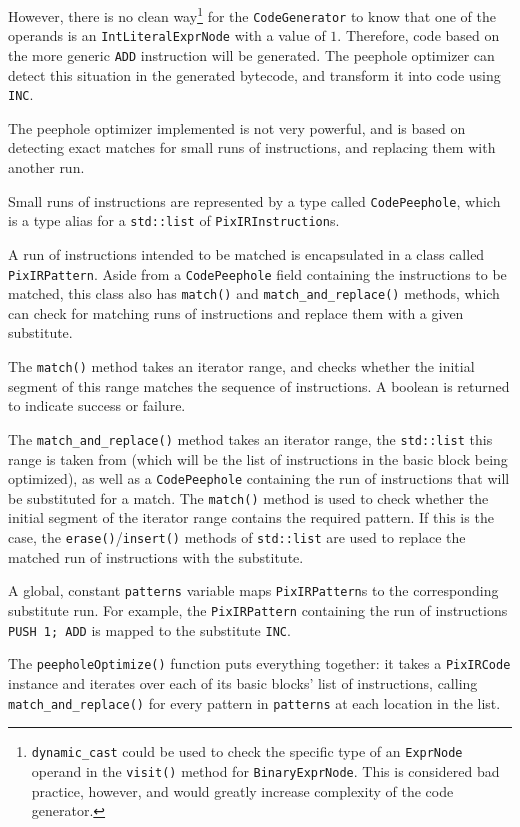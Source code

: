 \documentclass[11pt,a4paper]{scrartcl}
\begin{document}
However, there is no clean way\footnote{\verb|dynamic_cast| could be used to check the specific type of an \verb|ExprNode| operand in the \verb|visit()| method for \verb|BinaryExprNode|. This is considered bad practice, however, and would greatly increase complexity of the code generator.} for the \verb|CodeGenerator| to know that one of the operands is an \verb|IntLiteralExprNode| with a value of $1$. Therefore, code based on the more generic \verb|ADD| instruction will be generated. The peephole optimizer can detect this situation in the generated bytecode, and transform it into code using \verb|INC|.

The peephole optimizer implemented is not very powerful, and is based on detecting exact matches for small runs of instructions, and replacing them with another run.

Small runs of instructions are represented by a type called \verb|CodePeephole|, which is a type alias for a \verb|std::list| of \verb|PixIRInstruction|s.

A run of instructions intended to be matched is encapsulated in a class called \verb|PixIRPattern|. Aside from a \verb|CodePeephole| field containing the instructions to be matched, this class also has \verb|match()| and \verb|match_and_replace()| methods, which can check for matching runs of instructions and replace them with a given substitute.

The \verb|match()| method takes an iterator range, and checks whether the initial segment of this range matches the sequence of instructions. A boolean is returned to indicate success or failure.

The \verb|match_and_replace()| method takes an iterator range, the \verb|std::list| this range is taken from (which will be the list of instructions in the basic block being optimized), as well as a \verb|CodePeephole| containing the run of instructions that will be substituted for a match. The \verb|match()| method is used to check whether the initial segment of the iterator range contains the required pattern. If this is the case, the \verb|erase()|/\verb|insert()| methods of \verb|std::list| are used to replace the matched run of instructions with the substitute.

A global, constant \verb|patterns| variable maps \verb|PixIRPattern|s to the corresponding substitute run. For example, the \verb|PixIRPattern| containing the run of instructions \verb|PUSH 1; ADD| is mapped to the substitute \verb|INC|.

The \verb|peepholeOptimize()| function puts everything together: it takes a \verb|PixIRCode| instance and iterates over each of its basic blocks' list of instructions, calling \verb|match_and_replace()| for every pattern in \verb|patterns| at each location in the list.
\end{document}
